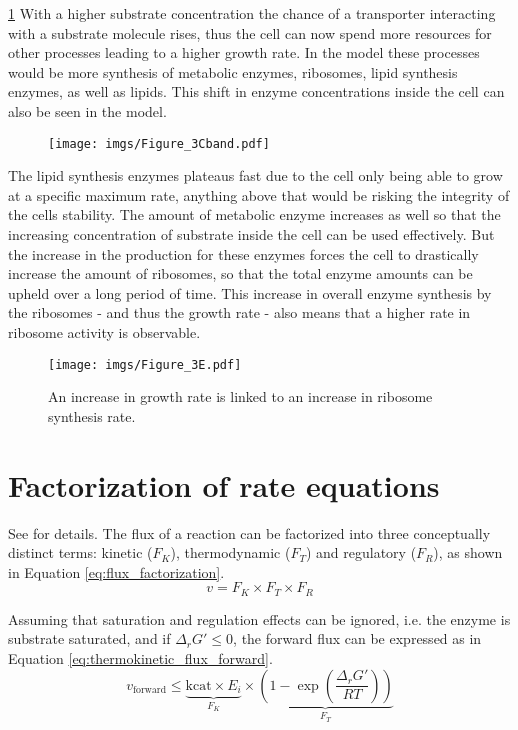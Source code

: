 \ref{fig:Figure_3Cband} With a higher substrate concentration the chance of a transporter interacting with a substrate molecule rises, thus the cell can now spend more resources for other processes leading to a higher growth rate.
In the model these processes would be more synthesis of metabolic enzymes, ribosomes, lipid synthesis enzymes, as well as lipids. This shift in enzyme concentrations inside the cell can also be seen in the model.

\begin{figure}[H]
    \centering
    \texttt{[image: imgs/Figure\_3Cband.pdf]}
    \caption{}
    \label{fig:Figure_3Cband}
\end{figure}

The lipid synthesis enzymes plateaus fast due to the cell only being able to grow at a specific maximum rate, anything above that would be risking the integrity of the cells stability. The amount of metabolic enzyme increases as well so that the increasing concentration of substrate inside the cell can be used effectively. But the increase in the production for these enzymes forces the cell to drastically increase the amount of ribosomes, so that the total enzyme amounts can be upheld over a long period of time. 
This increase in overall enzyme synthesis by the ribosomes - and thus the growth rate - also means that a higher rate in ribosome activity is observable.

\begin{figure}[H]
    \centering
    \texttt{[image: imgs/Figure\_3E.pdf]}
    \caption{An increase in growth rate is linked to an increase in ribosome synthesis rate.}
    \label{fig:Figure_3E}
\end{figure}


\section{Factorization of rate equations}
See \cite{noor2013note} for details. The flux of a reaction can be factorized into three
conceptually distinct terms: kinetic ($F_K$), thermodynamic ($F_T$) and regulatory ($F_R$),
as shown in Equation \ref{eq:flux_factorization}.
\begin{equation}
    v = F_K \times F_T \times F_R
    \label{eq:flux_factorization}
\end{equation}

Assuming that saturation and regulation effects can be ignored, i.e. the enzyme is substrate
saturated, and if $\Delta_r G' \leq 0$, the forward flux can be expressed as in Equation \ref{eq:thermokinetic_flux_forward}.
\begin{equation}
    v_\text{forward} \leq \underbrace{\text{kcat} \times E_i}_{F_K} \times \underbrace{\left(1 - \exp \left( \frac{\Delta_r G'}{RT} \right)\right)}_{F_T}
    \label{eq:thermokinetic_flux_forward}
\end{equation}

